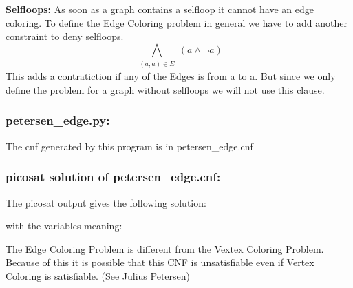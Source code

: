 \documentclass{../base/base}
\begin{document}
\textbf{Selfloops:}
As soon as a graph contains a selfloop it cannot have an edge coloring. To define the Edge Coloring problem in general we have to add another constraint to deny selfloops.
$$ \bigwedge_{\substack{(a,a) \in E}} (a \land \neg a) $$
This adds a contratiction if any of the Edges is from a to a.
But since we only define the problem for a graph without selfloops we will not use this clause.


\subsubsection{petersen\_edge.py:}


The cnf generated by this program is in petersen\_edge.cnf

\subsubsection{picosat solution of petersen\_edge.cnf:}
The picosat output gives the following solution:

with the variables meaning:


The Edge Coloring Problem is different from the Vextex Coloring Problem. Because of this it is possible that this CNF is unsatisfiable even if Vertex Coloring is satisfiable. (See Julius Petersen)
\end{document}

